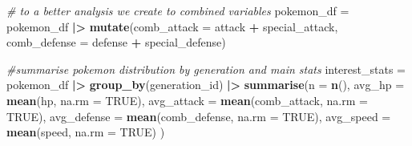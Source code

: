 \documentclass[
]{article}
\newenvironment{Shaded}{\begin{snugshade}}{\end{snugshade}}
\newcommand{\AttributeTok}[1]{\textcolor[rgb]{0.13,0.29,0.53}{#1}}
\newcommand{\CommentTok}[1]{\textcolor[rgb]{0.56,0.35,0.01}{\textit{#1}}}
\newcommand{\ConstantTok}[1]{\textcolor[rgb]{0.56,0.35,0.01}{#1}}
\newcommand{\FunctionTok}[1]{\textcolor[rgb]{0.13,0.29,0.53}{\textbf{#1}}}
\newcommand{\NormalTok}[1]{#1}
\newcommand{\OtherTok}[1]{\textcolor[rgb]{0.56,0.35,0.01}{#1}}
\newcommand{\SpecialCharTok}[1]{\textcolor[rgb]{0.81,0.36,0.00}{\textbf{#1}}}
\begin{document}
\begin{Shaded}
\begin{Highlighting}[]
\CommentTok{\# to a better analysis we create to combined variables}
\NormalTok{pokemon\_df }\OtherTok{=}\NormalTok{ pokemon\_df }\SpecialCharTok{|\textgreater{}} 
  \FunctionTok{mutate}\NormalTok{(}\AttributeTok{comb\_attack =}\NormalTok{ attack }\SpecialCharTok{+}\NormalTok{ special\_attack,}
         \AttributeTok{comb\_defense =}\NormalTok{ defense }\SpecialCharTok{+}\NormalTok{ special\_defense)}
         
\CommentTok{\#summarise pokemon distribution by generation and main stats}
\NormalTok{interest\_stats }\OtherTok{=}\NormalTok{ pokemon\_df }\SpecialCharTok{|\textgreater{}} 
  \FunctionTok{group\_by}\NormalTok{(generation\_id) }\SpecialCharTok{|\textgreater{}} 
  \FunctionTok{summarise}\NormalTok{(}\AttributeTok{n =} \FunctionTok{n}\NormalTok{(),}
            \AttributeTok{avg\_hp =} \FunctionTok{mean}\NormalTok{(hp, }\AttributeTok{na.rm =} \ConstantTok{TRUE}\NormalTok{),}
            \AttributeTok{avg\_attack =} \FunctionTok{mean}\NormalTok{(comb\_attack, }\AttributeTok{na.rm =} \ConstantTok{TRUE}\NormalTok{),}
            \AttributeTok{avg\_defense =} \FunctionTok{mean}\NormalTok{(comb\_defense, }\AttributeTok{na.rm =} \ConstantTok{TRUE}\NormalTok{),}
            \AttributeTok{avg\_speed =} \FunctionTok{mean}\NormalTok{(speed, }\AttributeTok{na.rm =} \ConstantTok{TRUE}\NormalTok{)}
\NormalTok{)}
\end{Highlighting}
\end{Shaded}
\end{document}
